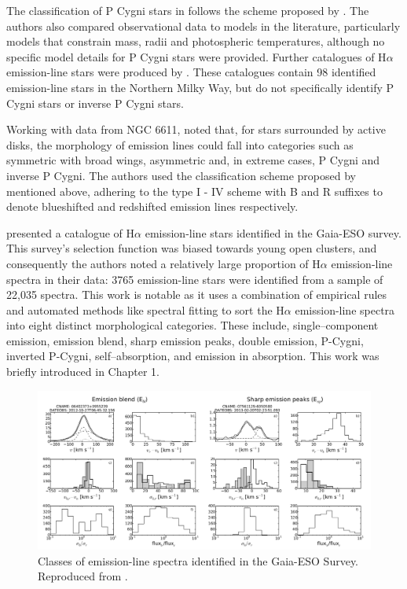 The classification of P Cygni stars in \citet{reipurth1996halpha} follows the scheme proposed by \citet{1953PDAO....9....1B}. The authors also compared observational data to models in the literature, particularly models that constrain mass, radii and photospheric temperatures, although no specific model details for P Cygni stars were provided. Further catalogues of H$\alpha$ emission-line stars were produced by \citet{kohoutek1999catalogue}. These catalogues contain 98 identified emission-line stars in the Northern Milky Way, but do not specifically identify P Cygni stars or inverse P Cygni stars.

Working with data from NGC 6611, \citet{bonito2013spectroscopic} noted that, for stars surrounded by active disks, the morphology of  emission lines could fall into categories such as symmetric with broad wings, asymmetric and, in extreme cases, P Cygni and inverse P Cygni. The authors used the classification scheme proposed by \citet{reipurth1996halpha} mentioned above, adhering to the type I - IV scheme with B and R suffixes to denote blueshifted and redshifted emission lines respectively.

 \citet{traven2015gaia} presented a catalogue of H$\alpha$ emission-line stars identified in the Gaia-ESO survey. This survey's selection function was biased towards young open clusters, and consequently the authors noted a relatively large proportion of H$\alpha$ emission-line spectra in their data: 3765 emission-line stars were identified from a sample of 22,035 spectra. This work is notable as it uses a combination of empirical rules and automated methods like spectral fitting to sort the H$\alpha$ emission-line spectra into eight distinct morphological categories. These include, single–component emission, emission blend, sharp emission peaks, double emission, P-Cygni, inverted P-Cygni, self–absorption, and emission in absorption. This work was briefly introduced in Chapter 1.  

\begin{figure}[!htb]
\centering
\includegraphics[scale=.47]{figures/gaia eso1.png}
\caption{Classes of emission-line spectra identified in the Gaia-ESO Survey. Reproduced from \citet{traven2015gaia}.}
\end{figure}

